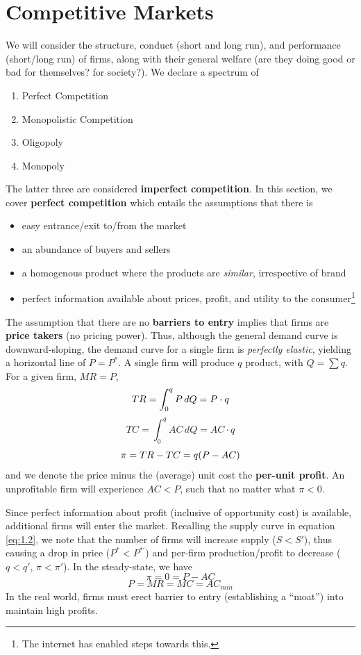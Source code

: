 \documentclass{article}
\begin{document}
\section{Competitive Markets}
We will consider the structure, conduct (short and long run), and performance (short/long run) of firms, along with their general welfare (are they doing good or bad for themselves? for society?). We declare a spectrum of
\begin{enumerate}
	\item Perfect Competition
	\item Monopolistic Competition
	\item Oligopoly
	\item Monopoly
\end{enumerate}
The latter three are considered \textbf{imperfect competition}. In this section, we cover \textbf{perfect competition} which entails the assumptions that there is
\begin{itemize}
	\item easy entrance/exit to/from the market
	\item an abundance of buyers and sellers
	\item a homogenous product where the products are \textit{similar}, irrespective of brand
	\item perfect information available about prices, profit, and utility to the consumer\footnote{The internet has enabled steps towards this.}
\end{itemize}
The assumption that there are no \textbf{barriers to entry} implies that firms are \textbf{price takers} (no pricing power). Thus, although the general demand curve is downward-sloping, the demand curve for a single firm is \textit{perfectly elastic}, yielding a horizontal line of $P=P^*$. A single firm will produce $q$ product, with $Q = \sum q$. For a given firm, $MR=P$,
\[
    TR = \int_0^q P\,dQ = P\cdot q\\
\]
\[
    TC = \int_0^q AC\,dQ = AC\cdot q
\]
\[
    \pi = TR - TC = q(P-AC)\\
\]
and we denote the price minus the (average) unit cost the \textbf{per-unit profit}. An unprofitable firm will experience $AC<P$, such that no matter what $\pi<0$.

Since perfect information about profit (inclusive of opportunity cost) is available, additional firms will enter the market. Recalling the supply curve in equation \ref{eq:1.2}, we note that the number of firms will increase supply ($S<S'$), thus causing a drop in price ($P^* <P^{*\prime}$) and per-firm production/profit to decrease ($q<q'$, $\pi<\pi'$). In the steady-state, we have
\[\pi = 0 = P-AC\]
\[ P = MR = MC = AC_{min}\]
In the real world, firms must erect barrier to entry (establishing a ``moat'') into maintain high profits.
\end{document}
